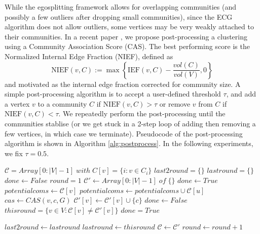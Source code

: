 \documentclass[review,los,12pt]{ryethesis}
\newcommand{\cC}{{\mathcal C}}
\begin{document}
While the egosplitting framework allows for overlapping communities (and possibly a few outliers after dropping small communities), since the ECG algorithm does not allow outliers, some vertices may be very weakly attached to their communities.
In a recent paper \cite{cas}, we propose post-processing a clustering using a Community Association Score (CAS).
The best performing score is the Normalized Internal Edge Fraction (NIEF), defined as
\begin{equation}
    \mathrm{NIEF}(v, C) := \max\left\{ \mathrm{IEF}(v, C) - \frac{vol(C)}{vol(V)} , 0 \right\}
\end{equation}
and motivated as the internal edge fraction corrected for community size.
A simple post-processing algorithm is to accept a user-defined threshold $\tau$, and add a vertex $v$ to a community $C$ if $\mathrm{NIEF}(v, C) > \tau$ or remove $v$ from $C$ if $\mathrm{NIEF}(v, C) < \tau$.
We repeatedly perform the post-processing until the communities stablise (or we get stuck in a 2-step loop of adding then removing a few vertices, in which case we terminate).
Pseudocode of the post-processing algorithm is shown in Algorithm \ref{alg:postprocess}.
In the following experiments, we fix $\tau = 0.5$.
\begin{algorithm}
    \caption{CAS Post-processing Algorithm}
    \label{alg:postprocess}
    \begin{algorithmic}
    \Ensure $\cC = Array[0:|V|-1] \; with \; C[v] = \{i: v \in C_i\}$
    \Function{PostProcess}{$\cC, G, \tau$}
    \State $last2round = \{\}$
    \State $lastround = \{\}$
    \State $done \gets False$
    \State $round = 1$
        \State $\cC' \gets Array[0:|V|-1] \; of \; \{\}$
        \State $done \gets True$
            \State $potentialcoms \gets \cC[v]$
                \State $potentialcoms \gets potentialcoms \cup \cC[u]$
            \EndFor
                \State $cas \gets CAS(v, c, G)$
                    \State $\cC'[v] \gets \cC'[v] \cup \{c\}$
                    \State $done \gets False$
                \EndIf
            \EndFor
        \EndFor
        \State $thisround = \{v \in V: \cC[v] \neq \cC'[v]\}$
            \State $done = True$
        \EndIf

        \State $last2round \gets lastround$
        \State $lastround \gets thisround$
        \State $\cC \gets \cC'$
        \State $round \gets round + 1$
    \EndWhile\\
    \Return{$\cC$}
    \EndFunction
    \end{algorithmic}
\end{algorithm}
\end{document}

